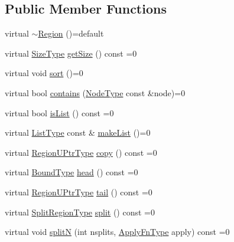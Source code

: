 \subsection*{Public Member Functions}
\begin{DoxyCompactItemize}
\item 
virtual \hyperlink{structvt_1_1group_1_1region_1_1_region_a90f363a11f5215870c4eb01ef1672223}{$\sim$\+Region} ()=default
\item 
virtual \hyperlink{structvt_1_1group_1_1region_1_1_region_a9bb381adf31111aae34dbc644bad6c1f}{Size\+Type} \hyperlink{structvt_1_1group_1_1region_1_1_region_ab0db5f78c57943b4b9973ba2c7c619f7}{get\+Size} () const =0
\item 
virtual void \hyperlink{structvt_1_1group_1_1region_1_1_region_a169304bf82a87ff958333595bed2603d}{sort} ()=0
\item 
virtual bool \hyperlink{structvt_1_1group_1_1region_1_1_region_a1e0ebd7367476fb397faf06a03b5583c}{contains} (\hyperlink{namespacevt_a866da9d0efc19c0a1ce79e9e492f47e2}{Node\+Type} const \&node)=0
\item 
virtual bool \hyperlink{structvt_1_1group_1_1region_1_1_region_a5c05e6ebee5a6d7e77d9ebf33c9ff50c}{is\+List} () const =0
\item 
virtual \hyperlink{structvt_1_1group_1_1region_1_1_region_a4e35b2fc6dca06aca0b7bc0e19b35c5a}{List\+Type} const  \& \hyperlink{structvt_1_1group_1_1region_1_1_region_ac85c027b3c402c712c888aefc198c6be}{make\+List} ()=0
\item 
virtual \hyperlink{structvt_1_1group_1_1region_1_1_region_ae5f42cf159116a3cf8bd65423eb01037}{Region\+U\+Ptr\+Type} \hyperlink{structvt_1_1group_1_1region_1_1_region_a040d20a4f8c6fa351d7fe1cbfcae3a03}{copy} () const =0
\item 
virtual \hyperlink{structvt_1_1group_1_1region_1_1_region_abf426ff85bed72c1c6524fad6a9f1751}{Bound\+Type} \hyperlink{structvt_1_1group_1_1region_1_1_region_a09d21333389937f11dd5d3e6ba566c54}{head} () const =0
\item 
virtual \hyperlink{structvt_1_1group_1_1region_1_1_region_ae5f42cf159116a3cf8bd65423eb01037}{Region\+U\+Ptr\+Type} \hyperlink{structvt_1_1group_1_1region_1_1_region_a7d5bc5711c1b7954e27defa4dc94af40}{tail} () const =0
\item 
virtual \hyperlink{structvt_1_1group_1_1region_1_1_region_ab8d05c0978c7f38292a9ed5a15498a4b}{Split\+Region\+Type} \hyperlink{structvt_1_1group_1_1region_1_1_region_a2cbbbff6358f0f63235d95501858f512}{split} () const =0
\item 
virtual void \hyperlink{structvt_1_1group_1_1region_1_1_region_ae8660d4218b57e91664dedfa807cd936}{splitN} (int nsplits, \hyperlink{structvt_1_1group_1_1region_1_1_region_a7c9e99b1157d2fe2f3e6fc36a1463a96}{Apply\+Fn\+Type} apply) const =0
\end{DoxyCompactItemize}


